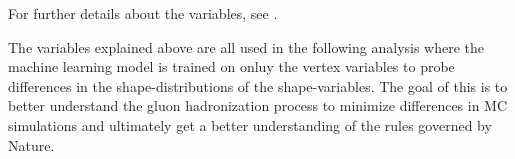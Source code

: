 For further details about the variables, see \citet{Armstrong1998hy}. 

The variables explained above are all used in the following analysis where the machine learning model is trained on onluy the vertex variables to probe differences in the shape-distributions of the shape-variables. The goal of this is to better understand the gluon hadronization process to minimize differences in MC simulations and ultimately get a better understanding of the rules governed by Nature.  
